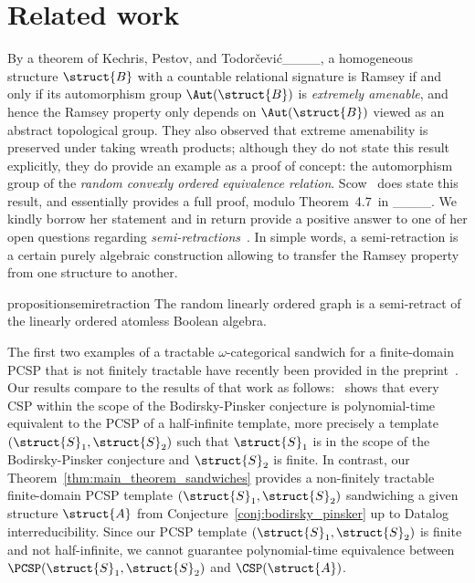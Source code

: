 \section{Related work}
\label{subsect:relatedwork}
 
 By a theorem of Kechris, Pestov, and Todor\v{c}evi\'c____, a homogeneous structure $\struct{B}$ with a countable relational signature is Ramsey if and only if its automorphism group $\Aut(\struct{B})$ is \emph{extremely amenable}, and hence the Ramsey property only depends on $\Aut(\struct{B})$ viewed as an abstract topological group.  
%
They also observed that extreme amenability is preserved under taking wreath products; although they do not state this result explicitly, they do provide an example as a proof of concept: the automorphism group of the \emph{random convexly ordered equivalence relation}.  
 Scow~\cite[Theorem~5.13]{scow2021ramsey} does state this result, and essentially provides a full proof, modulo Theorem~4.7~in ____.
 We kindly borrow her statement and in return provide a positive answer to one of her open questions regarding \emph{semi-retractions}~\cite[Question 4.3]{BARTOŠOVÁ_SCOW_2024}.
 In simple words, a semi-retraction is a certain purely algebraic construction allowing to transfer   the Ramsey property from one structure to another.   

\begin{restatable}{proposition}{semiretraction} \label{prop:rg_semiret_aba} 
  The random linearly ordered graph is a semi-retract of the linearly ordered atomless Boolean algebra. %
 \end{restatable}
 
 The first two examples of a tractable $\omega$-categorical sandwich for a finite-domain PCSP that is not finitely tractable have  recently been provided in the preprint~\cite[Propositions~35 and~36]{Mottet_2025}. Our results compare to the results of that work as follows:~\cite[Theorem 1]{Mottet_2025}  shows that every CSP within the scope of the Bodirsky-Pinsker conjecture is polynomial-time equivalent to the PCSP of a half-infinite template, more precisely a template $(\struct{S}_1,\struct{S}_2)$ such that $\struct{S}_1$ is in the scope of the Bodirsky-Pinsker conjecture and $\struct{S}_2$ is finite.
%
In contrast, our Theorem~\ref{thm:main_theorem_sandwiches} provides a non-finitely tractable finite-domain PCSP template $(\struct{S}_1,\struct{S}_2)$ sandwiching a given structure $\struct{A}$ from Conjecture~\ref{conj:bodirsky_pinsker} up to Datalog interreducibility.
%
Since our PCSP template $(\struct{S}_1,\struct{S}_2)$ is finite and not half-infinite, we cannot guarantee polynomial-time equivalence between $\PCSP(\struct{S}_1,\struct{S}_2)$ and $\CSP(\struct{A})$.